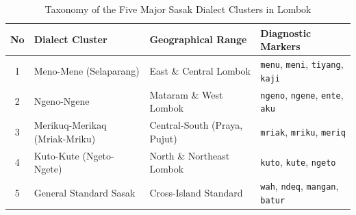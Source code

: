 \documentclass[journal,10pt]{IEEEtran}
\begin{document}
\begin{table}[htbp]
\caption{Taxonomy of the Five Major Sasak Dialect Clusters in Lombok \cite{hakim2023, balaibahasa2022, hakim2022}}
\label{tab:dialect_taxonomy}
\centering
\begin{tabular}{|c|l|l|l|}
\hline
\textbf{No} & \textbf{Dialect Cluster} & \textbf{Geographical Range} & \textbf{Diagnostic Markers} \\ \hline
1 & Meno-Mene (Selaparang) & East \& Central Lombok & \texttt{menu}, \texttt{meni}, \texttt{tiyang}, \texttt{kaji} \\ \hline
2 & Ngeno-Ngene            & Mataram \& West Lombok      & \texttt{ngeno}, \texttt{ngene}, \texttt{ente}, \texttt{aku} \\ \hline
3 & Merikuq-Merikaq (Mriak-Mriku) & Central-South (Praya, Pujut) & \texttt{mriak}, \texttt{mriku}, \texttt{meriq} \\ \hline
4 & Kuto-Kute (Ngeto-Ngete)       & North \& Northeast Lombok & \texttt{kuto}, \texttt{kute}, \texttt{ngeto} \\ \hline
5 & General Standard Sasak & Cross-Island Standard       & \texttt{wah}, \texttt{ndeq}, \texttt{mangan}, \texttt{batur} \\ \hline
\end{tabular}
\end{table}
\end{document}
